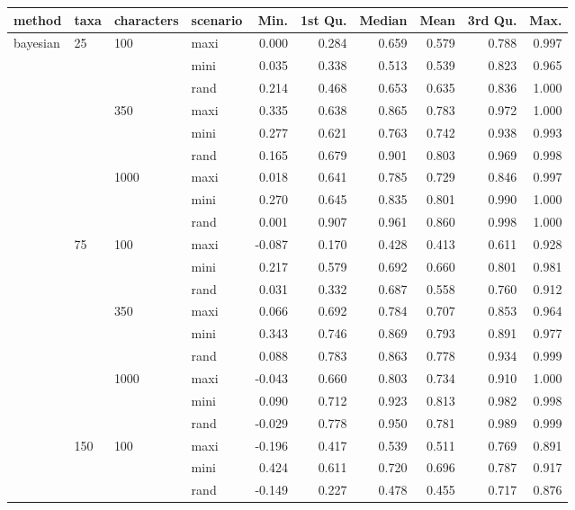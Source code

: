\begin{longtable}{llllrrrrrr}
  \hline
method & taxa & characters & scenario & Min. & 1st Qu. & Median & Mean & 3rd Qu. & Max. \\ 
  \hline
bayesian & 25 & 100 & maxi & 0.000 & 0.284 & 0.659 & 0.579 & 0.788 & 0.997 \\ 
   &  &  & mini & 0.035 & 0.338 & 0.513 & 0.539 & 0.823 & 0.965 \\ 
   &  &  & rand & 0.214 & 0.468 & 0.653 & 0.635 & 0.836 & 1.000 \\ 
   &  & 350 & maxi & 0.335 & 0.638 & 0.865 & 0.783 & 0.972 & 1.000 \\ 
   &  &  & mini & 0.277 & 0.621 & 0.763 & 0.742 & 0.938 & 0.993 \\ 
   &  &  & rand & 0.165 & 0.679 & 0.901 & 0.803 & 0.969 & 0.998 \\ 
   &  & 1000 & maxi & 0.018 & 0.641 & 0.785 & 0.729 & 0.846 & 0.997 \\ 
   &  &  & mini & 0.270 & 0.645 & 0.835 & 0.801 & 0.990 & 1.000 \\ 
   &  &  & rand & 0.001 & 0.907 & 0.961 & 0.860 & 0.998 & 1.000 \\ 
   & 75 & 100 & maxi & -0.087 & 0.170 & 0.428 & 0.413 & 0.611 & 0.928 \\ 
   &  &  & mini & 0.217 & 0.579 & 0.692 & 0.660 & 0.801 & 0.981 \\ 
   &  &  & rand & 0.031 & 0.332 & 0.687 & 0.558 & 0.760 & 0.912 \\ 
   &  & 350 & maxi & 0.066 & 0.692 & 0.784 & 0.707 & 0.853 & 0.964 \\ 
   &  &  & mini & 0.343 & 0.746 & 0.869 & 0.793 & 0.891 & 0.977 \\ 
   &  &  & rand & 0.088 & 0.783 & 0.863 & 0.778 & 0.934 & 0.999 \\ 
   &  & 1000 & maxi & -0.043 & 0.660 & 0.803 & 0.734 & 0.910 & 1.000 \\ 
   &  &  & mini & 0.090 & 0.712 & 0.923 & 0.813 & 0.982 & 0.998 \\ 
   &  &  & rand & -0.029 & 0.778 & 0.950 & 0.781 & 0.989 & 0.999 \\ 
   & 150 & 100 & maxi & -0.196 & 0.417 & 0.539 & 0.511 & 0.769 & 0.891 \\ 
   &  &  & mini & 0.424 & 0.611 & 0.720 & 0.696 & 0.787 & 0.917 \\ 
   &  &  & rand & -0.149 & 0.227 & 0.478 & 0.455 & 0.717 & 0.876 \\ 

\end{longtable}
